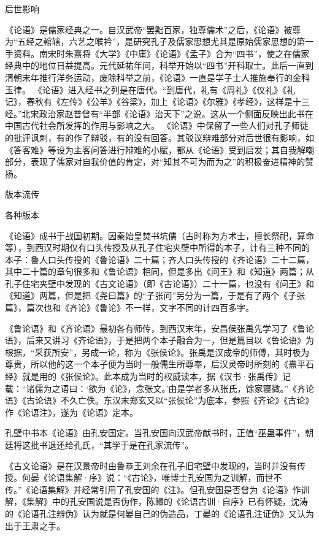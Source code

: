 \documentclass[a4paper,12pt,UTF8,twoside]{ctexbook}
\begin{document}
后世影响

《论语》是儒家经典之一。自汉武帝“罢黜百家，独尊儒术”之后，《论语》被尊为“五经之輨辖，六艺之喉衿”，是研究孔子及儒家思想尤其是原始儒家思想的第一手资料。南宋时朱熹将《大学》《中庸》《论语》《孟子》合为“四书”，使之在儒家经典中的地位日益提高。元代延祐年间，科举开始以“四书”开科取士。此后一直到清朝末年推行洋务运动，废除科举之前，《论语》一直是学子士人推施奉行的金科玉律。
《论语》进入经书之列是在唐代。“到唐代，礼有《周礼》《仪礼》《礼记》，春秋有《左传》《公羊》《谷梁》，加上《论语》《尔雅》《孝经》，这样是十三经。”北宋政治家赵普曾有“半部《论语》治天下”之说。这从一个侧面反映出此书在中国古代社会所发挥的作用与影响之大。
《论语》中保留了一些人们对孔子师徒的批评讽刺，有的作了辩驳，有的没有回答。其驳议辩难部分对后世很有影响，如《答客难》等设为主客问答进行辩难的小赋，都从《论语》受到启发；其自我解嘲部分，表现了儒家对自我价值的肯定，对“知其不可为而为之”的积极奋进精神的赞扬。

版本流传

各种版本

《论语》成书于战国初期。因秦始皇焚书坑儒（古时称为方术士，擅长祭祀，算命等），到西汉时期仅有口头传授及从孔子住宅夹壁中所得的本子，计有三种不同的本子：鲁人口头传授的《鲁论语》二十篇；齐人口头传授的《齐论语》二十二篇，其中二十篇的章句很多和《鲁论语》相同，但是多出《问王》和《知道》两篇；从孔子住宅夹壁中发现的《古文论语》（即《古论语》）二十一篇，也没有《问王》和《知道》两篇，但是把《尧曰篇》的“子张问”另分为一篇，于是有了两个《子张篇》，篇次也和《齐论》《鲁论》不一样，文字不同的计四百多字。

《鲁论语》和《齐论语》最初各有师传，到西汉末年，安昌侯张禹先学习了《鲁论语》，后来又讲习《齐论语》，于是把两个本子融合为一，但是篇目以《鲁论语》为根据，“采获所安”，另成一论，称为《张侯论》。张禹是汉成帝的师傅，其时极为尊贵，所以他的这一个本子便为当时一般儒生所尊奉，后汉灵帝时所刻的《熹平石经》就是用的《张侯论》。此本成为当时的权威读本，据《汉书·张禹传》记载：“诸儒为之语曰：‘欲为《论》，念张文。’由是学者多从张氏，馀家寝微。”《齐论语》《古论语》不久亡佚。东汉末郑玄又以“张侯论”为底本，参照《齐论》《古论》作《论语注》，遂为《论语》定本。

孔壁中书本《论语》由孔安国定。当孔安国向汉武帝献书时，正值“巫蛊事件”，朝廷将这批书退还给孔氏，“其学于是在孔家流传”。

《古文论语》是在汉景帝时由鲁恭王刘余在孔子旧宅壁中发现的，当时并没有传授。何晏《论语集解·序》说：“《古论》，唯博士孔安国为之训解，而世不传。”《论语集解》并经常引用了孔安国的《注》。但孔安国是否曾为《论语》作训解，《集解》中的孔安国说是否伪作，陈鳣的《论语古训·自序》已有怀疑，沈涛的《论语孔注辨伪》认为就是何晏自己的伪造品，丁晏的《论语孔注证伪》又认为出于王肃之手。
\end{document}
